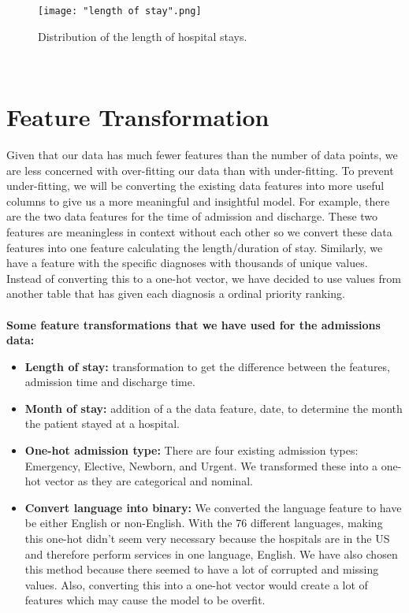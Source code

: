 \documentclass[12pt]{article}
\begin{document}
\begin{figure}[htp]
    \centering
    \texttt{[image: "length of stay".png]}
    \caption{Distribution of the length of hospital stays.}
    \label{fig:num-read}
\end{figure}
\\

\section{Feature Transformation}
Given that our data has much fewer features than the number of data points, we are less concerned with over-fitting our data than with under-fitting. To prevent under-fitting, we will be converting the existing data features into more useful columns to give us a more meaningful and insightful model. For example, there are the two data features for the time of admission and discharge. These two features are meaningless in context without each other so we convert these data features into one feature calculating the length/duration of stay. Similarly, we have a feature with the specific diagnoses with thousands of unique values. Instead of converting this to a one-hot vector, we have decided to use values from another table that has given each diagnosis a ordinal priority ranking. \\ \\
\textbf{Some feature transformations that we have used for the admissions data: }

\begin{itemize}
    \item \textbf{Length of stay:} transformation to get the difference between the features, admission time and discharge time. 
    \item \textbf{Month of stay:} addition of a the data feature, date, to determine the month the patient stayed at a hospital. 
    \item \textbf{One-hot admission type:} There are four existing admission types: Emergency, Elective, Newborn, and Urgent. We transformed these into a one-hot vector as they are categorical and
    nominal.
    \item \textbf{Convert language into binary:} We converted the language feature to have be either English or non-English. With the 76 different languages, making this one-hot didn't seem very necessary because the hospitals are in the US and therefore perform services in one language, English. We have also chosen this method because there seemed to have a lot of corrupted and missing values. Also, converting this into a one-hot vector would create a lot of features which may cause the model to be overfit. 
    
\end{itemize}
\end{document}
